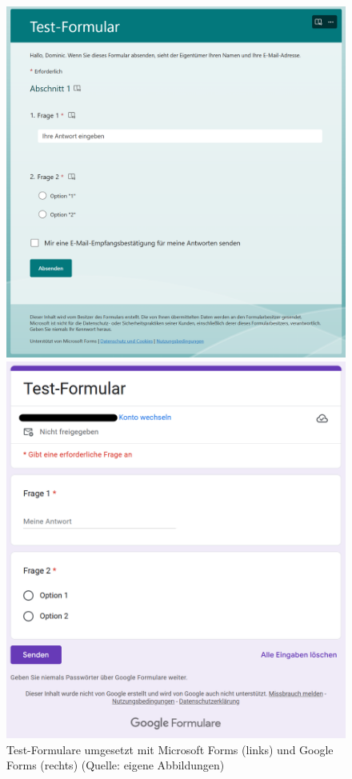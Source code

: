 \documentclass[a4paper,12pt,twoside]{scrreprt}
\begin{document}
\begin{figure}[ht]
    \centering
    \begin{minipage}{.49\textwidth}
        \centering
        \includegraphics[width=.95\linewidth]{thesis/images/Luidold_Microsoft-Forms-Testformular.png}
    \end{minipage}
    \begin{minipage}{.49\textwidth}
        \centering
        \includegraphics[width=.95\linewidth]{thesis/images/Luidold_Google-Forms-Testformular.png}
    \end{minipage}
    \caption[Test-Formulare umgesetzt mit Microsoft Forms und Google Forms]{Test-Formulare umgesetzt mit Microsoft Forms (links) und Google Forms (rechts) (Quelle: eigene Abbildungen)}
    \label{fig:microsoft-google-forms-testformulare}
\end{figure}
\end{document}
